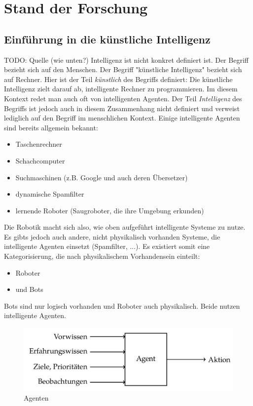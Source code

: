 \chapter{Stand der Forschung}
\section{Einführung in die künstliche Intelligenz}
TODO: Quelle (wie unten?)
Intelligenz ist nicht konkret definiert ist. Der Begriff bezieht sich auf den Menschen. Der Begriff "künstliche Intelligenz" bezieht sich auf Rechner. Hier ist der Teil \textit{künstlich} des Begriffs definiert: Die künstliche Intelligenz zielt darauf ab, intelligente Rechner zu programmieren. Im diesem Kontext redet man auch oft von intelligenten Agenten. Der Teil \textit{Intelligenz} des Begriffs ist jedoch auch in diesem Zusammenhang nicht definiert und verweist lediglich auf den Begriff im menschlichen Kontext.
Einige intelligente Agenten sind bereits allgemein bekannt:
\begin{itemize}
\item Taschenrechner
\item Schachcomputer
\item Suchmaschinen (z.B. Google und auch deren Übersetzer)
\item dynamische Spamfilter 
\item lernende Roboter (Saugroboter, die ihre Umgebung erkunden) 
\end{itemize}

Die Robotik macht sich also, wie oben aufgeführt intelligente Systeme zu nutze. Es gibts jedoch auch andere, nicht physikalisch vorhanden Systeme, die intelligente Agenten einsetzt (Spamfilter, ...). Es existiert somit eine Kategorisierung, die nach physikalischem Vorhandensein einteilt:
\begin{itemize}
\item Roboter
\item und Bots
\end{itemize} 
Bots sind nur logisch vorhanden und Roboter auch physikalisch. Beide nutzen intelligente Agenten. 


\begin{figure}%
\includegraphics[scale=0.3]{bilder/agent} 
\caption{Agenten \cite{Schauss}}
\label{Agenten}
\end{figure}


